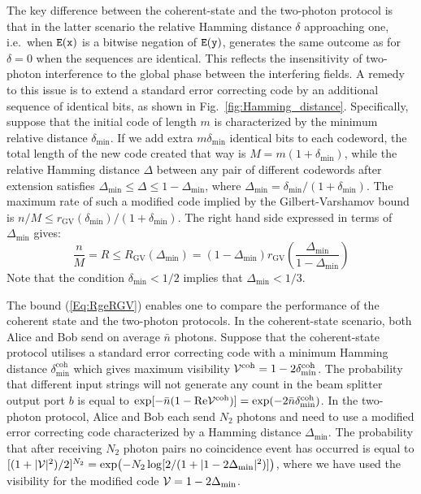 \documentclass[10pt]{article}
\begin{document}
 The key difference between the coherent-state and the two-photon protocol is that in the latter scenario the relative Hamming distance $\delta$ approaching one, i.e.\ when ${\tt E}({\tt x})$ is a bitwise negation of ${\tt E}({\tt y})$, generates the same outcome as for $\delta=0$ when the sequences are identical. This reflects the insensitivity of two-photon interference to the global phase between the interfering fields. A remedy to this issue is to extend a standard error correcting code by an additional sequence of identical bits, as shown in Fig.~\ref{fig:Hamming_distance}. Specifically, suppose that the initial code of length $m$ is characterized by the minimum relative distance $\delta_{\text{min}}$. If we add extra $m\delta_{\text{min}} $ identical bits to each codeword, the total length of the new code created that way is $M= m(1+\delta_{\text{min}})$, while the relative Hamming distance $\Delta$ between any pair of different codewords after extension satisfies $\Delta_{\text{min}} \le \Delta \le  1-\Delta_{\text{min}}$, where $\Delta_{\text{min}} = \delta_{\text{min}}/(1+\delta_{\text{min}})$. The maximum rate of such a modified code implied by the Gilbert-Varshamov bound is $n/M  \le r_{\text{GV}}(\delta_{\text{min}})/(1+\delta_{\text{min}})$. The right hand side expressed in terms of $\Delta_{\text{min}}$ gives:
\begin{equation}
 \frac{n}{M} = R  \le R_{\text{GV}} (\Delta_{\text{min}}) = (1-\Delta_{\text{min}}) r_{\text{GV}} \left( \frac{\Delta_{\text{min}}}{1-\Delta_{\text{min}}}\right)
\label{Eq:RgeRGV}
\end{equation}
Note that the condition $\delta_{\text{min}} < 1/2$ implies that $\Delta_{\text{min}} < 1/3$.




The bound (\ref{Eq:RgeRGV}) enables one to compare the performance of the coherent state and the two-photon protocols.
In the coherent-state scenario, both Alice and Bob send on average $\bar{n}$ photons. Suppose that the coherent-state protocol utilises a standard error correcting code with a minimum Hamming distance $\delta_{\text{min}}^{\text{coh}}$ which gives maximum visibility ${\cal V}^{\text{coh}} = 1 - 2\delta_{\text{min}}^{\text{coh}}$. The probability that different input strings will not generate any count in the beam splitter output port $b$ is equal to $\exp[-\bar{n}(1-\text{Re} {\cal V}^{\text{coh}})] =\exp(-2 \bar{n} \delta_{\text{min}}^{\text{coh}})$. In the two-photon protocol, Alice and Bob each send $N_2$ photons and need to use a modified error correcting code characterized by a Hamming distance $\Delta_{\text{min}}$. The probability that after receiving $N_2$ photon pairs no coincidence event has occurred is equal to $[(1+|{\cal V}|^2)/2]^{N_2}= \exp\bigl(-N_2 \log[2/(1+|1-2\Delta_{\text{min}}|^2)] \bigr)$, where we have used the visibility for the modified code ${\cal V} = 1-2\Delta_{\text{min}}$.
\end{document}
